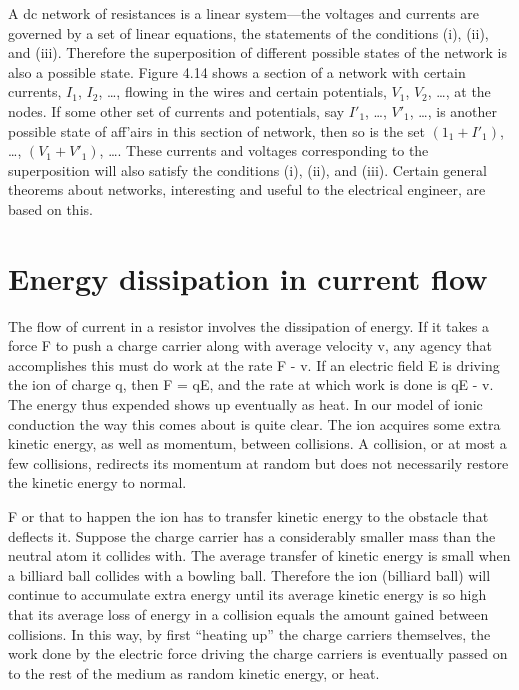 A dc network of resistances is a linear system---the voltages and
currents are governed by a set of linear equations, the statements of
the conditions (i), (ii), and (iii). Therefore the superposition of
different possible states of the network is also a possible state. 
Figure 4.14 shows a section of a network with certain currents, $I_1$,
$I_2$, \ldots, flowing in the wires and certain potentials, $V_1$, $V_2$, \ldots, at
the nodes. If some other set of currents and potentials, say $I'_1$, \ldots,
$V'_1$, \ldots, is another possible state of aff'airs in this section of network,
then so is the set $(1_1 + I'_1)$, \ldots, $(V_1 + V'_1)$, \ldots. These currents
and voltages corresponding to the superposition will also satisfy the
conditions (i), (ii), and (iii). Certain general theorems about 
networks, interesting and useful to the electrical engineer, are based
on this.

\iffalse

\section{Energy dissipation in current flow}

The flow of current in a resistor involves the dissipation of energy.
If it takes a force F to push a charge carrier along with average
velocity v, any agency that accomplishes this must do work at the
rate F - v. If an electric field E is driving the ion of charge q, then
F = qE, and the rate at which work is done is qE - v. The energy
thus expended shows up eventually as heat. In our model of ionic
conduction the way this comes about is quite clear. The ion acquires
some extra kinetic energy, as well as momentum, between collisions.
A collision, or at most a few collisions, redirects its momentum at
random but does not necessarily restore the kinetic energy to normal.

F or that to happen the ion has to transfer kinetic energy to the obstacle
that deflects it. Suppose the charge carrier has a considerably
smaller mass than the neutral atom it collides with. The average
transfer of kinetic energy is small when a billiard ball collides with
a bowling ball. Therefore the ion (billiard ball) will continue to
accumulate extra energy until its average kinetic energy is so high
that its average loss of energy in a collision equals the amount gained
between collisions. In this way, by first ``heating up'' the charge
carriers themselves, the work done by the electric force driving the
charge carriers is eventually passed on to the rest of the medium as
random kinetic energy, or heat.


